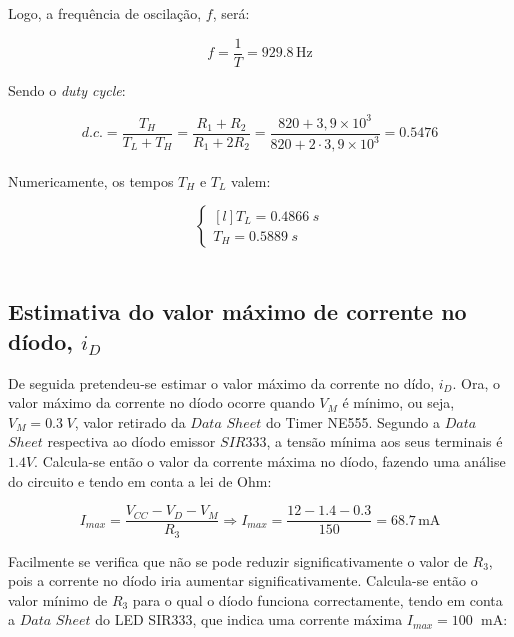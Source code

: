 \documentclass[a4paper,11pt]{report}
\begin{document}
Logo, a frequência de oscilação, $f$, será:

\begin{equation}
f=\frac{1}{T}=929.8\,\textrm{Hz}
\end{equation}

Sendo o \textit{duty cycle}:

\begin{equation}
d.c.=\frac{T_H}{T_L+T_H}=\frac{R_1+R_2}{R_1+2R_2}=\frac{820+3,9\times10^3}{820+2\cdot3,9\times10^3}=0.5476
\end{equation}\\


Numericamente, os tempos $T_H$ e $T_L$ valem:

\begin{equation*}
\left\{\begin{matrix*}[l]
	T_L=0.4866\hspace{3pt}s\\
	T_H=0.5889\hspace{3pt}s
\end{matrix*}\right.
\end{equation*}\\

\subsection{Estimativa do valor máximo de corrente no díodo, $i_D$}
De seguida pretendeu-se estimar o valor máximo da corrente no dído, $i_D$. Ora, o valor máximo da corrente no díodo ocorre quando $V_M$ é mínimo, ou seja,  $V_M=0.3\hspace{3pt} V$, valor retirado da $Data$ $Sheet$ do Timer NE555. Segundo a $Data$ $Sheet$ respectiva ao díodo emissor $SIR333$, a tensão mínima aos seus terminais é $1.4V$.
Calcula-se então o valor da corrente máxima no díodo, fazendo uma análise do circuito e tendo em conta a lei de Ohm:

\begin{equation}
I_{max}=\frac{V_{CC}-V_{D}-V_M}{R_3}\Rightarrow I_{max}=\frac{12-1.4-0.3}{150}=68.7 \,\textrm{mA} \label{eq:4.12}
\end{equation}

Facilmente se verifica que não se pode reduzir significativamente o valor de $R_3$, pois a corrente no díodo iria aumentar significativamente. Calcula-se então o valor mínimo de $R_3$ para o qual o díodo funciona correctamente, tendo em conta a $Data$ $Sheet$ do LED SIR333, que indica uma corrente máxima $I_{max}=100\hspace{3pt}$ mA:
\end{document}
